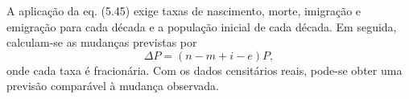 A aplicação da eq. (5.45) exige taxas de nascimento, morte, imigração e emigração para cada década e a população inicial de cada década. Em seguida, calculam-se as mudanças previstas por
\[
\Delta P = (n-m+i-e)P,
\]
onde cada taxa é fracionária. Com os dados censitários reais, pode-se obter uma previsão comparável à mudança observada. 
